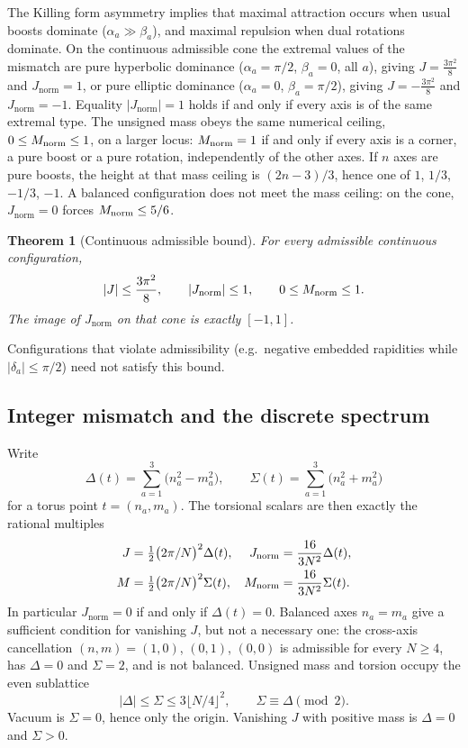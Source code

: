 \documentclass[a4paper]{article}
\newtheorem{theorem}{Theorem}[section]
\theoremstyle{definition}
\newcommand{\Jnorm}{J_{\mathrm{norm}}}
\newcommand{\Jbound}{\frac{3\pi^2}{8}}
\newcommand{\Mnorm}{M_{\rm norm}}
\begin{document}
The Killing form asymmetry implies that maximal attraction occurs when usual boosts dominate ($\alpha_a \gg \beta_a$), and maximal repulsion when dual rotations dominate. On the continuous admissible cone the extremal values of the mismatch are pure hyperbolic dominance ($\alpha_a=\pi/2$, $\beta_a=0$, all $a$), giving $J=\Jbound$ and $\Jnorm=1$, or pure elliptic dominance ($\alpha_a=0$, $\beta_a=\pi/2$), giving $J=-\Jbound$ and $\Jnorm=-1$. Equality $|\Jnorm|=1$ holds if and only if every axis is of the same extremal type. The unsigned mass obeys the same numerical ceiling, $0\leq\Mnorm\leq 1$, on a larger locus: $\Mnorm=1$ if and only if every axis is a corner, a pure boost or a pure rotation, independently of the other axes. If $n$ axes are pure boosts, the height at that mass ceiling is $(2n-3)/3$, hence one of $1$, $1/3$, $-1/3$, $-1$. A balanced configuration does not meet the mass ceiling: on the cone, $\Jnorm=0$ forces $\Mnorm\leq 5/6$.

\begin{theorem}[Continuous admissible bound]
\label{thm:continuous-bound}
For every admissible continuous configuration,
\[
|J| \leq \Jbound, \qquad |\Jnorm| \leq 1, \qquad 0\leq \Mnorm\leq 1.
\]
The image of $\Jnorm$ on that cone is exactly $[-1,1]$.
\end{theorem}

Configurations that violate admissibility (e.g.\ negative embedded rapidities while $|\delta_a|\leq\pi/2$) need not satisfy this bound.

\subsection{Integer mismatch and the discrete spectrum}

Write
\[
\Delta(t)=\sum_{a=1}^3\bigl(n_a^2-m_a^2\bigr),\qquad
\Sigma(t)=\sum_{a=1}^3\bigl(n_a^2+m_a^2\bigr)
\]
for a torus point $t=(n_a,m_a)$. The torsional scalars are then exactly the rational multiples
\begin{equation}
\label{eq:spectrum}
\begin{aligned}
J&=\tfrac12\bigl(2\pi/N\bigr)^2\Delta(t),
&
\Jnorm&=\frac{16}{3N^2}\Delta(t),\\
M&=\tfrac12\bigl(2\pi/N\bigr)^2\Sigma(t),
&
\Mnorm&=\frac{16}{3N^2}\Sigma(t).
\end{aligned}
\end{equation}
In particular $\Jnorm=0$ if and only if $\Delta(t)=0$. Balanced axes $n_a=m_a$ give a sufficient condition for vanishing $J$, but not a necessary one: the cross-axis cancellation $(n,m)=(1,0)$, $(0,1)$, $(0,0)$ is admissible for every $N\geq 4$, has $\Delta=0$ and $\Sigma=2$, and is not balanced. Unsigned mass and torsion occupy the even sublattice
\[
|\Delta|\leq\Sigma\leq 3\bigl\lfloor N/4\bigr\rfloor^2,\qquad
\Sigma\equiv\Delta\pmod{2}.
\]
Vacuum is $\Sigma=0$, hence only the origin. Vanishing $J$ with positive mass is $\Delta=0$ and $\Sigma>0$.
\end{document}
